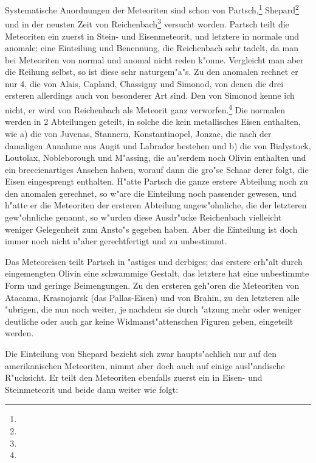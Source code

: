 \documentclass[a4paper, 11pt, oneside]{article}
\begin{document}
Systematische Anordnungen der Meteoriten sind schon von Partsch,\footnote{} Shepard\footnote{} und in der neusten Zeit von Reichenbach\footnote{} versucht worden. Partsch teilt die Meteoriten ein zuerst in Stein- und Eisenmeteorit, und letztere in normale und anomale; eine Einteilung und Benennung, die Reichenbach sehr tadelt, da man bei Meteoriten von normal und anomal nicht reden k"onne. Vergleicht man aber die Reihung selbst, so ist diese sehr naturgem"a"s. Zu den anomalen rechnet er nur 4, die von Alais, Capland, Chassigny und Simonod, von denen die drei ersteren allerdings auch von besonderer Art sind. Den von Simonod kenne ich nicht, er wird von Reichenbach als Meteorit ganz verworfen.\footnote{} Die normalen werden in 2 Abteilungen geteilt, in solche die kein metallisches Eisen enthalten, wie a) die von Juvenas, Stannern, Konstantinopel, Jonzac, die nach der damaligen Annahme aus Augit und Labrador bestehen und b) die von Bialystock, Loutolax, Nobleborough und M"assing, die au"serdem noch Olivin enthalten und ein breccienartiges Ansehen haben, worauf dann die gro"se Schaar derer folgt, die Eisen eingesprengt enthalten. H"atte Partsch die ganze erstere Abteilung noch zu den anomalen gerechnet, so w"are die Einteilung noch passender gewesen, und h"atte er die Meteoriten der ersteren Abteilung ungew"ohnliche, die der letzteren gew"ohnliche genannt, so w"urden diese Ausdr"ucke Reichenbach vielleicht weniger Gelegenheit zum Ansto"s gegeben haben. Aber die Einteilung ist doch immer noch nicht n"aher gerechtfertigt und zu unbestimmt.

Das Meteoreisen teilt Partsch in "astiges und derbiges; das erstere erh"alt durch eingemengten Olivin eine schwammige Gestalt, das letztere hat eine unbestimmte Form und geringe Beimengungen. Zu den ersteren geh"oren die Meteoriten von Atacama, Krasnojarsk (das Pallas-Eisen) und von Brahin, zu den letzteren alle "ubrigen, die nun noch weiter, je nachdem sie durch "atzung mehr oder weniger deutliche oder auch gar keine Widmanst"attenschen Figuren geben, eingeteilt werden.

Die Einteilung von Shepard bezieht sich zwar haupts"achlich nur auf den amerikanischen Meteoriten, nimmt aber doch auch auf einige ausl"andische R"ucksicht. Er teilt den Meteoriten ebenfalls zuerst ein in Eisen- und Steinmeteorit und beide dann weiter wie folgt:
\end{document}
